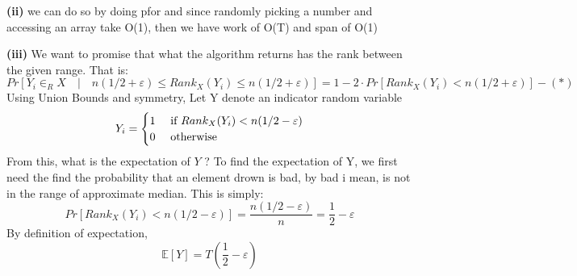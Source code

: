 \documentclass[a4paper, 11pt]{article}
\renewcommand{\part}[1] {\vspace{.10in} {\bf (#1)}}
\begin{document}
\part{ii} we can do so by doing pfor and since randomly picking a number and accessing an array take O(1), then we have work of O(T) and span of O(1)

\part{iii} We want to promise that what the algorithm returns has the rank between the given range.  That is:
$$Pr[ Y_i \in_R X \quad | \quad n(1/2+\varepsilon) \leq Rank_X(Y_i) \leq n(1/2+\varepsilon)] = 1 - 2\cdot Pr[Rank_X(Y_i) < n(1/2+\varepsilon)] -(*)$$
Using Union Bounds and symmetry,
Let Y denote an indicator random variable 
$$
Y_i = \begin{cases}
1 & \text{ if  } Rank_X(Y_i) < n(1/2 -\varepsilon) \\
0 &\textmd{ otherwise}
\end{cases}
$$
From this, what is the expectation of $Y$ ? To find the expectation of Y, we first need the find the probability that an element drown is bad, by bad i mean, is not in the range of approximate median. This is simply:
$$Pr[Rank_X(Y_i) < n(1/2 -\varepsilon)] = \frac{n(1/2-\varepsilon)}{n} = \frac{1}{2}-\varepsilon $$
By definition of expectation,
$$ \mathbb{E}[Y] = T(\frac{1}{2} -\varepsilon) $$
\end{document}
